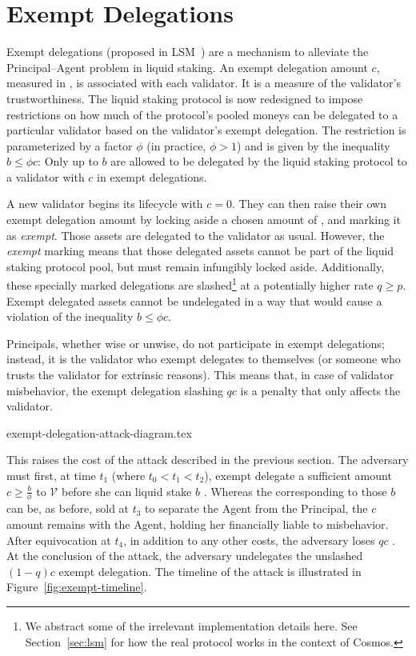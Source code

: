 \section{Exempt Delegations}

Exempt delegations (proposed in LSM~\cite{liquidity-staking-module})
are a mechanism to alleviate the Principal--Agent problem in liquid staking.
An exempt delegation amount $c$, measured in \asset, is associated
with each validator. It is a measure of the validator's trustworthiness.
The liquid staking protocol is now redesigned to impose restrictions
on how much of the protocol's pooled moneys can be delegated to a particular
validator based on the validator's exempt delegation.
The restriction is
parameterized by a factor $\phi$ (in practice, $\phi > 1$)
and is given by the inequality $b \leq \phi c$: Only up to $b$ \assets
are allowed to be delegated by the liquid staking protocol
to a validator with $c$ \assets in exempt delegations.

A new validator begins its lifecycle with $c = 0$. They can then
raise their own exempt delegation amount by locking aside a
chosen amount of \asset, and marking it as \emph{exempt}. Those
assets are delegated to the validator as usual. However,
the \emph{exempt}
marking means that those delegated assets cannot be part of the liquid
staking protocol pool, but must remain infungibly locked aside. Additionally,
these specially marked delegations are slashed\footnote{We abstract some
of the irrelevant implementation details here. See Section~\ref{sec:lsm}
for how the real protocol works in the context of Cosmos.}
at a potentially higher rate $q \geq p$. Exempt delegated assets cannot
be undelegated in a way that would cause a violation of the inequality
$b \leq \phi c$.

Principals, whether wise or unwise, do not participate in exempt
delegations; instead, it is the validator who exempt delegates to
themselves (or someone who trusts the validator for extrinsic reasons).
This means that, in case of validator misbehavior, the exempt delegation
slashing $qc$ is a penalty that only affects the validator.

{exempt-delegation-attack-diagram.tex}

This raises
the cost of the attack described in the previous section. The
adversary must first, at time $t_1$ (where $t_0 < t_1 < t_2$), exempt delegate a sufficient amount
$c \geq \frac{b}{\phi}$ \asset to $\mathcal{V}$ before she can liquid stake $b$ \asset.
Whereas the \stassets
corresponding to those $b$ \assets can be, as before, sold at $t_3$ to
separate the Agent from the Principal, the $c$ amount remains with the
Agent, holding her financially liable to misbehavior. After equivocation at $t_4$,
in addition to any other costs, the adversary loses $qc$ \asset. At the conclusion
of the attack, the adversary undelegates the unslashed $(1 - q)c$ exempt delegation.
The timeline of the attack is illustrated in Figure~\ref{fig:exempt-timeline}.

